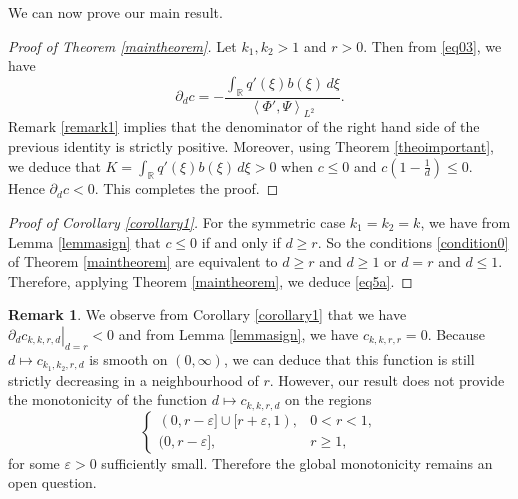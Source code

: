 \documentclass[11pt]{article}
\numberwithin{equation}{section}
\newcommand{\1}{\mathbbm{1}}
\numberwithin{equation}{section}
\theoremstyle{definition}
\newtheorem{remark}[theorem]{Remark}
\def \dis {\displaystyle}
\def \R {\mathbb{R}}
\def \c{c_{k_1,k_2,r,d}}
\numberwithin{equation}{section}
\def \dis {\displaystyle}
\begin{document}
We can now prove our main result.
\begin{proof}[Proof of Theorem \ref{maintheorem}]Let $k_1,k_2>1$ and $r>0$. Then from \eqref{eq03}, we have
\begin{equation*}
	\dis 	\partial_dc =-\frac{\dis \int_{\R}q'(\xi)b(\xi)\,d\xi}{\left \langle \Phi', \Psi\right\rangle_{L^2}}.
\end{equation*}
Remark \ref{remark1} implies that the denominator of the right hand side of the previous identity is strictly positive.  Moreover, using Theorem \ref{theoimportant}, we deduce that $K=\int_{\R}q'(\xi)b(\xi)\,d\xi>0$ when $c\leq 0$ and $c\left(1-\frac{1}{d}\right)\leq 0$. Hence $	\partial_dc<0$. This completes the proof. 
\end{proof}

\begin{proof}[Proof of Corollary \ref{corollary1}] For the symmetric case $k_1=k_2=k$, we have from Lemma \ref{lemmasign} that $c\leq 0$ if and only if $d\geq r$.  So the conditions \eqref{condition0} of Theorem \ref{maintheorem} are equivalent to $d\geq r$ and $d\geq 1$ or $d=r$ and $d\leq 1$.  Therefore,  applying Theorem \ref{maintheorem}, we deduce \eqref{eq5a}. 
\end{proof}

\begin{remark}\label{remark2}
We observe from Corollary \ref{corollary1} that we have $\left. \partial_d c_{k,k,r,d} \right|_{d=r}<0$ and from Lemma \ref{lemmasign}, we have $c_{k,k,r,r}=0$. Because $d\mapsto \c$ is smooth on $(0, \infty)$, we can deduce that this function is still strictly decreasing in a neighbourhood of $r$. However, our result does not provide the monotonicity of the function $d\mapsto c_{k,k,r,d}$ on the regions
\begin{equation*}
\begin{cases}
	(0, r-\varepsilon] \cup[r+\varepsilon, 1), & 0<r<1, \\ (0, r-\varepsilon], & r \geq 1,\end{cases}
\end{equation*}
for some $\varepsilon>0$ sufficiently small.  Therefore the global monotonicity remains an open question. 
\end{remark}
\end{document}
